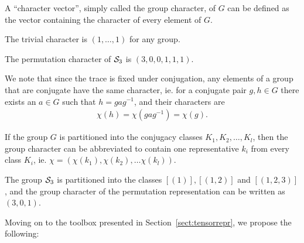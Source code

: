\begin{notation}
	A ``character vector'', simply called the group character, of $G$ can be defined as the vector containing the character of every element of $G$.
\end{notation}

\begin{example}
	The trivial character is $(1, \dots, 1)$ for any group.
\end{example}

\begin{example}
	The permutation character of $\mathcal{S}_3$ is $(3, 0, 0, 1, 1, 1)$.
\end{example}

\begin{remark}
	We note that since the trace is fixed under conjugation, any elements of a group that are conjugate have the same character, ie. for a conjugate pair $g,h \in G$ there exists an $a \in G$ such that $h = gag^{-1}$, and their characters are
	\begin{align*}
		\chi(h) = \chi(gag^{-1}) = \chi(g).
	\end{align*}
\end{remark}

\begin{notation}
	If the group $G$ is partitioned into the conjugacy classes $K_1, K_2, \dots, K_l$, then the group character can be abbreviated to contain one representative $k_i$ from every class $K_i$, ie. $\chi= (\chi(k_1), \chi(k_2), \dots \chi(k_l))$.
\end{notation}

\begin{example}
	The group $\mathcal{S}_3$ is partitioned into the classes $[(1)], [(1,2)]$ and $[(1,2,3)]$, and the group character of the permutation representation can be written as $(3,0,1)$.
\end{example}

Moving on to the toolbox presented in Section~\ref{sect:tensorrepr}, we propose the following:

